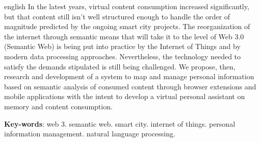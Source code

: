 \documentclass[
	12pt,				%
	openright,			%
	twoside,			%
	a4paper,			%
	english,			%
	french,				%
	spanish,			%
	brazil				%
	]{abntex2}
\begin{document}
\begin{resumo}[Abstract]
 \begin{otherlanguage*}{english}
   In the latest years, virtual content consumption increased significantly, but that content still isn't well structured enough to handle the order of magnitude predicted by the ongoing smart city projects. The reorganization of the internet through semantic means that will take it to the level of Web 3.0 (Semantic Web) is being put into practice by the Internet of Things and by modern data processing approaches. Nevertheless, the technology needed to satisfy the demands stipulated is still being challenged. We propose, then, research and development of a system to map and manage personal information based on semantic analysis of consumed content through browser extensions and mobile applications with the intent to develop a virtual personal assistant on memory and content consumption.

   \vspace{\onelineskip}
 
   \noindent 
   \textbf{Key-words}: web 3. semantic web. smart city. internet of things. personal information management. natural language processing.
 \end{otherlanguage*}
\end{resumo}

\listoffigures*
\cleardoublepage
\end{document}
